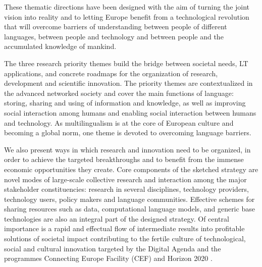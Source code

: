 \documentclass[10pt, plain]{../../metanetpaper}
\begin{document}
\begin{multicols}{2}
These thematic directions have been designed with the aim of turning the joint vision into reality and to letting Europe benefit from a technological revolution that will overcome barriers of understanding between people of different languages, between people and technology and between people and the accumulated knowledge of mankind.

The three research priority themes build the bridge between societal needs, LT applications, and concrete roadmaps for the organization of research, development and scientific innovation. The priority themes are contextualized in the advanced networked society and cover the main functions of language: storing, sharing and using of information and knowledge, as well as improving social interaction among humans and enabling social interaction between humans and technology. As multilingualism is at the core of European culture and becoming a global norm, one theme is devoted to overcoming language barriers.

We also present ways in which research and innovation need to be organized, in order to achieve the targeted breakthroughs and to benefit from the immense economic opportunities they create. Core components of the sketched strategy are novel modes of large-scale collective research and interaction among the major stakeholder constituencies: research in several disciplines, technology providers, technology users, policy makers and language communities. Effective schemes for sharing resources such as data, computational language models, and generic base technologies are also an integral part of the designed strategy. Of central importance is a rapid and effectual flow of intermediate results into profitable solutions of societal impact contributing to the fertile culture of technological, social and cultural innovation targeted by the Digital Agenda \cite{DA2010} and the programmes Connecting Europe Facility (CEF) \cite{CEF2011} and Horizon 2020 \cite{H2020}.



\end{multicols}
\end{document}
